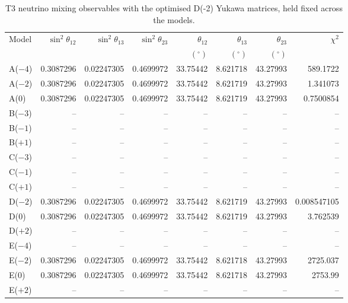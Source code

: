 \begin{table}[p]
\centering
\caption{T3 neutrino mixing observables with the optimised D(-2) Yukawa matrices, held fixed across the models.}
\label{tab:appC_Dm2_mixing}
\begingroup
\footnotesize
\setlength{\tabcolsep}{3.2pt}
\begin{tabular}{lrrrrrrr}
\hline
Model & $\sin^2\theta_{12}$ & $\sin^2\theta_{13}$ & $\sin^2\theta_{23}$ & $\theta_{12}$ & $\theta_{13}$ & $\theta_{23}$ & $\chi^2$ \\
 &  &  &  & $(^\circ)$ & $(^\circ)$ & $(^\circ)$ &  \\
\hline
A($-4$) & 0.3087296 & 0.02247305 & 0.4699972 & 33.75442 & 8.621718 & 43.27993 & 589.1722 \\
A($-2$) & 0.3087296 & 0.02247305 & 0.4699972 & 33.75442 & 8.621719 & 43.27993 & 1.341073 \\
A($0$) & 0.3087296 & 0.02247305 & 0.4699972 & 33.75442 & 8.621719 & 43.27993 & 0.7500854 \\
B($-3$) & -- & -- & -- & -- & -- & -- & -- \\
B($-1$) & -- & -- & -- & -- & -- & -- & -- \\
B($+1$) & -- & -- & -- & -- & -- & -- & -- \\
C($-3$) & -- & -- & -- & -- & -- & -- & -- \\
C($-1$) & -- & -- & -- & -- & -- & -- & -- \\
C($+1$) & -- & -- & -- & -- & -- & -- & -- \\
D($-2$) & 0.3087296 & 0.02247305 & 0.4699972 & 33.75442 & 8.621719 & 43.27993 & 0.008547105 \\
D($0$) & 0.3087296 & 0.02247305 & 0.4699972 & 33.75442 & 8.621719 & 43.27993 & 3.762539 \\
D($+2$) & -- & -- & -- & -- & -- & -- & -- \\
E($-4$) & -- & -- & -- & -- & -- & -- & -- \\
E($-2$) & 0.3087296 & 0.02247305 & 0.4699972 & 33.75442 & 8.621718 & 43.27993 & 2725.037 \\
E($0$) & 0.3087296 & 0.02247305 & 0.4699972 & 33.75442 & 8.621718 & 43.27993 & 2753.99 \\
E($+2$) & -- & -- & -- & -- & -- & -- & -- \\
\hline
\end{tabular}
\endgroup
\end{table}
